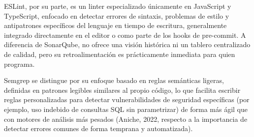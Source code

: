 \documentclass[12pt,a4paper]{article}
\begin{document}
ESLint, por su parte, es un linter especializado únicamente en
JavaScript y TypeScript, enfocado en detectar errores de sintaxis,
problemas de estilo y antipatrones específicos del lenguaje en
tiempo de escritura, generalmente integrado directamente en el editor
o como parte de los hooks de pre-commit. A diferencia de SonarQube,
no ofrece una visión histórica ni un tablero centralizado de
calidad, pero su retroalimentación es prácticamente inmediata para
quien programa.

Semgrep se distingue por su enfoque basado en reglas semánticas
ligeras, definidas en patrones legibles similares al propio código,
lo que facilita escribir reglas personalizadas para detectar
vulnerabilidades de seguridad específicas (por ejemplo, uso indebido
de consultas SQL sin parametrizar) de forma más ágil que con motores
de análisis más pesados (Aniche, 2022, respecto a la importancia de
detectar errores comunes de forma temprana y automatizada).

\begin{table}[h]
\centering
{}
\caption{Comparativa de herramientas de análisis estático de código. Fuente: elaboración propia con base en Khorikov (2020), Aniche (2022) y documentación oficial (docs.sonarsource.com, eslint.org, semgrep.dev).}
\label{tab:static}
\end{table}
\end{document}
